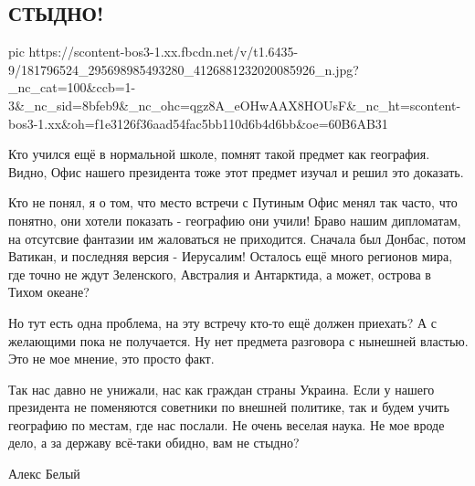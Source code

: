  
 
 
 
 

\subsection{СТЫДНО!}

\ifcmt
  pic https://scontent-bos3-1.xx.fbcdn.net/v/t1.6435-9/181796524_295698985493280_4126881232020085926_n.jpg?_nc_cat=100&ccb=1-3&_nc_sid=8bfeb9&_nc_ohc=qgz8A_eOHwAAX8HOUsF&_nc_ht=scontent-bos3-1.xx&oh=f1e3126f36aad54fac5bb110d6b4d6bb&oe=60B6AB31
\fi

Кто учился ещё в нормальной школе, помнят такой предмет как география. Видно,
Офис нашего президента тоже этот предмет изучал и решил это доказать. 

Кто не понял, я о том, что место встречи с Путиным Офис менял так часто, что
понятно, они хотели показать - географию они учили! Браво нашим дипломатам, на
отсутсвие фантазии  им жаловаться не приходится. Сначала был Донбас, потом
Ватикан, и последняя версия - Иерусалим!  Осталось ещё много регионов мира, где
точно не ждут Зеленского, Австралия и Антарктида, а может, острова в Тихом
океане? 

Но тут есть одна проблема, на эту встречу кто-то ещё должен приехать? А с
желающими пока не получается. Ну нет предмета разговора с нынешней властью. Это
не мое мнение, это просто факт.

Так нас давно не унижали, нас как граждан страны Украина.  Если у нашего
президента не поменяются советники по внешней политике, так и будем учить
географию по местам, где нас послали. Не очень веселая наука. Не мое вроде
дело, а за державу всё-таки обидно, вам не стыдно?

Алекс Белый
